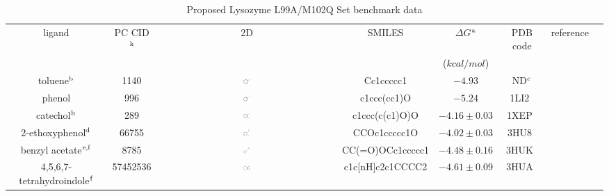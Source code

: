 \documentclass[aps,pre,twocolumn,nofootinbib,superscriptaddress,10pt, final,tightenlines]{revtex4-1}
\begin{document}
\begingroup
\squeezetable
\begin{table}
\caption{Proposed Lysozyme L99A/M102Q Set benchmark data}
\label{polar_benchmark}
\begin{center}
\begin{tabular}{@{}| c | c | c | c | c | c | c | c@{}}
\hline
ligand & PC CID$^{\rm k}$ & 2D & SMILES & $\Delta G$$^{\rm a}$ & PDB code & reference\\\
           &      &         &  & ($kcal/mol$) &                  &                 \\\hline

toluene$^{\rm b}$ & 1140 & \includegraphics[width=0.04\textwidth]{figures/1140.pdf} &  Cc1ccccc1 & $-4.93$ &  ND$^{\rm c}$ &  \cite{wei_model_2002}\\ %
phenol & 996 & \includegraphics[width=0.04\textwidth]{figures/996.pdf} & c1ccc(cc1)O  & $-5.24$ &  1LI2~\cite{wei_model_2002} &  \cite{wei_model_2002}\\ %
catechol$^{\rm h}$ & 289 & \includegraphics[width=0.04\textwidth]{figures/289.pdf} &  c1ccc(c(c1)O)O & $-4.16\pm0.03$  & 1XEP~\cite{graves_decoys_2005} & \cite{wei_model_2002}\\ %
2-ethoxyphenol$^{\rm d}$ & 66755 & \includegraphics[width=0.04\textwidth]{figures/66755.pdf} &CCOc1ccccc1O & $-4.02\pm0.03$ & 3HU8~\cite{boyce_predicting_2009} & \cite{boyce_predicting_2009} \\%
benzyl acetate$^{\rm e, f}$ & 8785 & \includegraphics[width=0.04\textwidth]{figures/8785.pdf} & CC(=O)OCc1ccccc1 & $-4.48\pm0.16$ & 3HUK~\cite{boyce_predicting_2009} & \cite{boyce_predicting_2009} \\ %
4,5,6,7-tetrahydroindole$^{\rm f}$ & 57452536 &  \includegraphics[width=0.04\textwidth]{figures/57452536.pdf} & c1c[nH]c2c1CCCC2 & $-4.61\pm0.09$ & 3HUA~\cite{boyce_predicting_2009} &  \cite{boyce_predicting_2009} \\ %

\end{tabular}
\end{center}
\end{table}
\end{document}
